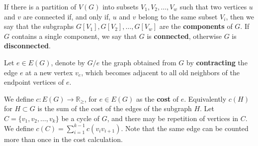 
If there is a partition of \(V(G)\) into subsets \(V_1 , V_2 , \dots, V_w\) such that two vertices \(u\) and \(v\) are connected if, and only if, \(u\) and \(v\) belong to the same subset \(V_i\), then we say that the subgraphs \(G[V_1], G[V_2], \dots, G[V_w]\) are the \textbf{components} of \(G\). If \(G\) contains a single component, we say that \(G\) is \textbf{connected}, otherwise \(G\) is \textbf{disconnected}.


Let \(e \in E(G)\), denote by \(G / e\) the graph obtained from \(G\) by \textbf{contracting} the edge \(e\) at a new vertex \(v_e\), which becomes adjacent to all old neighbors of the endpoint vertices of \(e\).


We define \(c \colon E(G) \to \mathbb{R}_\ge\), for \(e \in E(G)\) as the \textbf{cost} of \(e\). Equivalently \(c(H)\) for \(H \subset G\) is the sum of the cost of the edges of the subgraph \(H\). Let \(C = \{v_1, v_2, \dots, v_k\}\) be a cycle of \(G\), and there may be repetition of vertices in \(C\). We define \(c(C) = \sum_{i=1}^{k-1} c(v_i v_{i+1})\). Note that the same edge can be counted more than once in the cost calculation.


